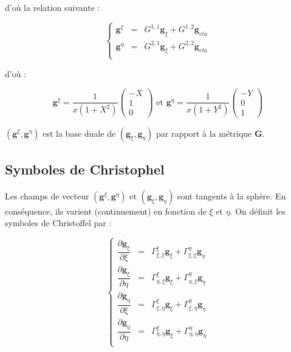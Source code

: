 d'où la relation suivante :

\begin{equation}
\left\lbrace
\begin{array}{rcl}
\mathbf{g}^{\xi} & = & G^{1,1} \mathbf{g}_{\xi} + G^{1,2} \mathbf{g}_{eta} \\
\mathbf{g}^{\eta} & = & G^{2,1} \mathbf{g}_{\xi} + G^{2,2} \mathbf{g}_{eta} \\
\end{array}
\right.
\end{equation}

d'où :

\begin{equation}
\mathbf{g}^{\xi} = \dfrac{1}{x(1+X^2)}\begin{pmatrix}
-X \\ 1 \\ 0
\end{pmatrix} \text{ et } \mathbf{g}^{\eta} = \dfrac{1}{x(1+Y^2)}\begin{pmatrix}
-Y \\ 0 \\ 1
\end{pmatrix}
\end{equation}

$( \mathbf{g}^{\xi}, \mathbf{g}^{\eta})$ est la base duale de $(\mathbf{g}_{\xi}, \mathbf{g}_{\eta})$ par rapport à la métrique $\mathbf{G}$.

\subsection{Symboles de Christophel}

Les champs de vecteur $( \mathbf{g}^{\xi}, \mathbf{g}^{\eta})$ et $( \mathbf{g}_ {\xi}, \mathbf{g}_{\eta})$ sont tangents à la sphère. En conséquence, ils varient (continuement) en fonction de $\xi$ et $\eta$. On définit les symboles de Christoffel par :

\begin{equation}
\left\lbrace
\begin{array}{rcl}
\dfrac{\partial \mathbf{g}_{\xi}}{\partial \xi} & = & \Gamma_{\xi,\xi}^{\xi} \mathbf{g}_{\xi} + \Gamma_{\xi,\xi}^{\eta} \mathbf{g}_{\eta}\\

\dfrac{\partial \mathbf{g}_{\xi}}{\partial \eta} & = & \Gamma_{\eta,\xi}^{\xi} \mathbf{g}_{\xi} + \Gamma_{\eta,\xi}^{\eta} \mathbf{g}_{\eta}\\

\dfrac{\partial \mathbf{g}_{\eta}}{\partial \xi} & = & \Gamma_{\xi,\eta}^{\xi} \mathbf{g}_{\xi} + \Gamma_{\xi,\eta}^{\eta} \mathbf{g}_{\eta}\\

\dfrac{\partial \mathbf{g}_{\eta}}{\partial \eta} & = & \Gamma_{\eta,\eta}^{\xi} \mathbf{g}_{\xi} + \Gamma_{\eta,\eta}^{\eta} \mathbf{g}_{\eta}\\
\end{array}
\right.
\end{equation}

